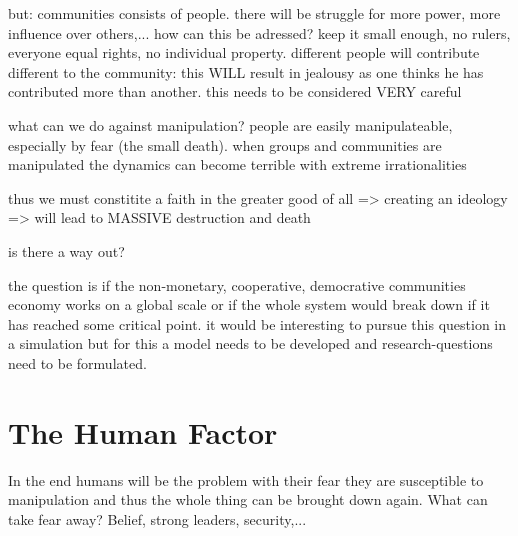 \documentclass{article}
\begin{document}
but: communities consists of people. there will be struggle for more power, more influence over others,... how can this be adressed? keep it small enough, no rulers, everyone equal rights, no individual property. different people will contribute different to the community: this WILL result in jealousy as one thinks he has contributed more than another. this needs to be considered VERY careful

what can we do against manipulation? people are easily manipulateable, especially by fear (the small death). when groups and communities are manipulated the dynamics can become terrible with extreme irrationalities

thus we must constitite a faith in the greater good of all => creating an ideology => will lead to MASSIVE destruction and death

is there a way out?

the question is if the non-monetary, cooperative, democrative communities economy works on a global scale or if the whole system would break down if it has reached some critical point. it would be interesting to pursue this question in a simulation but for this a model needs to be developed and research-questions need to be formulated.

\section{The Human Factor}
In the end humans will be the problem with their fear they are susceptible to manipulation and thus the whole thing can be brought down again. What can take fear away? Belief, strong leaders, security,...





\end{document}
